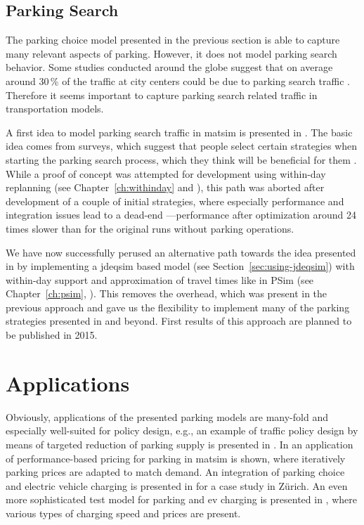 \subsection{Parking Search}
The parking choice model presented in the previous section is able to capture many relevant aspects of parking. However, it does not model parking search behavior. Some studies conducted around the globe suggest that on average around 30\,\% of the traffic at city centers could be due to parking search traffic \citet[][]{Shoup_RSUE_2004}. Therefore it seems important to capture parking search related traffic in transportation models.

A first idea to model parking search traffic in \gls{matsim} is presented in \citet[][]{Waraich_unpub_IATBR_2012}. The basic idea comes from surveys, which suggest that people select certain strategies when starting the parking search process, which they think will be beneficial for them \citet[][]{AxhausenPolak_1989}. While a proof of concept was attempted for development using within-day replanning (see Chapter~\ref{ch:withinday} and \citep[][]{DoblerEtAl_TRR_2012}), this path was aborted after development of a couple of initial strategies, where especially performance and integration issues lead to a dead-end \citet[][]{WaraichEtAl_unpub_TRB_2013}---performance after optimization around 24\,times slower than for the original runs without parking operations. 

We have now successfully perused an alternative path towards the idea presented in \citet[][]{Waraich_unpub_IATBR_2012} by implementing a \gls{jdeqsim} based model (see Section~\ref{sec:using-jdeqsim}) with within-day support and approximation of travel times like in PSim (see Chapter~\ref{ch:psim}, \citet[][]{FourieEtAl_TRR_2013}). This removes the overhead, which was present in the previous approach and gave us the flexibility to implement many of the parking strategies presented in \citet[][]{AxhausenPolak_1989} and beyond. First results of this approach are planned to be published in 2015.

\section{Applications}
Obviously, applications of the presented parking models are many-fold and especially well-suited for policy design, e.g., an example of traffic policy design by means of targeted reduction of parking supply is presented in \citet[][]{WaraichAxhausen_TRR_2012}. In \citet[][]{WaraichEtAl_unpub_TRB_2013} an application of performance-based pricing for parking in \gls{matsim} is shown, where iteratively parking prices are adapted to match demand. An integration of parking choice and electric vehicle charging is presented in \citet[][]{WaraichEtAl_JanssensEtAl_2014} for a case study in Zürich. An even more sophisticated test model for parking and \gls{ev} charging is presented in \citet[][]{BemetzHohenfellner_BSCThesis_2014}, where various types of charging speed and prices are present.

